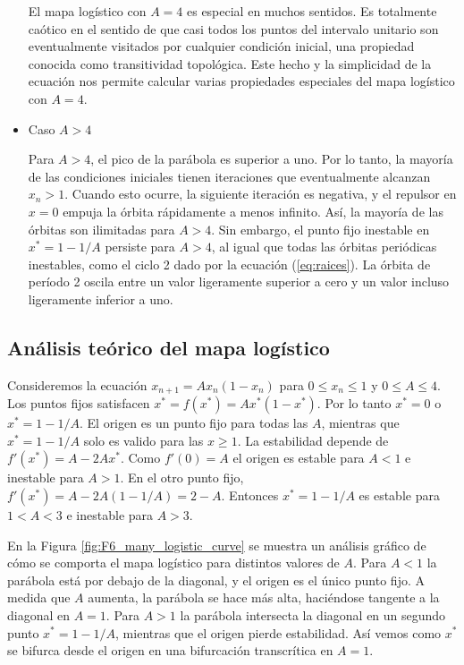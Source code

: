 \begin{itemize}
                    El mapa logístico con $ A = 4 $ es especial en muchos sentidos. Es totalmente caótico en el sentido de que casi todos los puntos del intervalo unitario son eventualmente visitados por cualquier condición inicial, una propiedad conocida como transitividad topológica. Este hecho y la simplicidad de la ecuación nos permite calcular varias propiedades especiales del mapa logístico con $ A = 4 $.

                \item Caso $A > 4$

                    Para $A > 4$, el pico de la parábola es superior a uno. Por lo tanto, la mayoría de las condiciones iniciales tienen iteraciones que eventualmente alcanzan $x_{n} > 1$. Cuando esto ocurre, la siguiente iteración es negativa, y el repulsor en $x = 0$ empuja la órbita rápidamente a menos infinito. Así, la mayoría de las órbitas son ilimitadas para $A > 4$. Sin embargo, el punto fijo inestable en $x^{*} = 1 - 1/A$ persiste para $A > 4$, al igual que todas las órbitas periódicas inestables, como el ciclo 2 dado por la ecuación (\ref{eq:raices}). La órbita de período 2 oscila entre un valor ligeramente superior a cero y un valor incluso ligeramente inferior a uno. 

        \end{itemize}

    \newpage
        \subsection{Análisis teórico del mapa logístico}

            Consideremos la ecuación $x_{n+1} = A x_{n} (1 - x_{n})$ para $0 \leq x_{n} \leq 1$ y $0 \leq A \leq 4$. Los puntos fijos satisfacen $x^{*} = f(x^{*}) = A x^{*}(1 - x^{*})$. Por lo tanto $x^{*} = 0$  o $x^{*} = 1 - 1/A$. El origen es un punto fijo para todas las $A$, mientras que $x^{*} = 1 - 1/A$ solo es valido para las $x \geq 1$. La estabilidad depende de $f'(x^{*}) = A - 2Ax^{*}$. Como $f'(0) = A $ el origen es estable para $A < 1$ e inestable para $A > 1$. En el otro punto fijo, $f'(x^{*}) = A - 2 A \left( 1 - 1/A \right) = 2 - A$. Entonces $x^{*} = 1 - 1/A$ es estable para $1 < A < 3$ e inestable para $A > 3$.

            En la Figura \ref{fig:F6_many_logistic_curve} se muestra un análisis gráfico de cómo se comporta el mapa logístico para distintos valores de $A$. Para $A < 1$ la parábola está por debajo de la diagonal, y el origen es el único punto fijo. A medida que $A$ aumenta, la parábola se hace más alta, haciéndose tangente a la diagonal en $A = 1$. Para $A > 1$ la parábola intersecta la diagonal en un segundo punto $x^{*} = 1 - 1/A$, mientras que el origen pierde estabilidad. Así vemos como $x^{*}$ se bifurca desde el origen en una bifurcación transcrítica en $A = 1$. 

